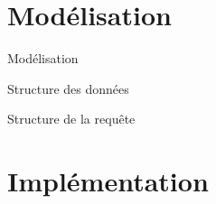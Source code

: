 \documentclass[10pt,handout]{beamer}
\begin{document}
\section{Modélisation}

\begin{frame}{Modélisation}

\end{frame}

\begin{frame}{Structure des données}
\end{frame}

\begin{frame}{Structure de la requête}
\end{frame}

\section{Implémentation}
\end{document}
